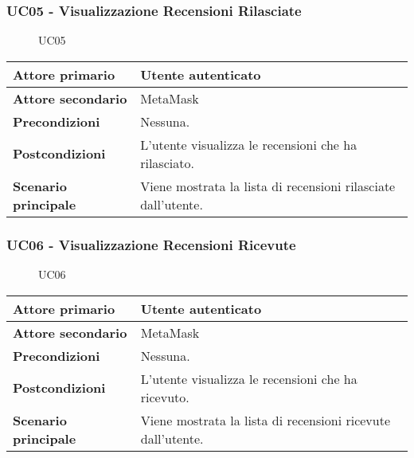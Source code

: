 \subsubsection{UC05 - Visualizzazione Recensioni Rilasciate}
\label{UC05}

\begin{figure}[H]
    \centering
    
    \caption{UC05}
 \end{figure}

\begin{center}
\renewcommand{\arraystretch}{1.5}
\begin{tabular}{ | m{10em} | m{20em} | }
    \hline
    \textbf{Attore primario} & Utente autenticato \\
    \hline
    \textbf{Attore secondario} & MetaMask \\
    \hline
    \textbf{Precondizioni} & Nessuna. \\
    \hline
    \textbf{Postcondizioni} & L'utente visualizza le recensioni che ha rilasciato. \\
    \hline
    \textbf{Scenario principale} & Viene mostrata la lista di recensioni rilasciate dall'utente. \\
    \hline
   \end{tabular}
\end{center}

\subsubsection{UC06 - Visualizzazione Recensioni Ricevute}
\label{UC06}

\begin{figure}[H]
    \centering
    
    \caption{UC06}
 \end{figure}

\begin{center}
\renewcommand{\arraystretch}{1.5}
\begin{tabular}{ | m{10em} | m{20em} | }
    \hline
    \textbf{Attore primario} & Utente autenticato \\
    \hline
    \textbf{Attore secondario} & MetaMask \\
    \hline
    \textbf{Precondizioni} & Nessuna. \\
    \hline
    \textbf{Postcondizioni} & L'utente visualizza le recensioni che ha ricevuto. \\
    \hline
    \textbf{Scenario principale} & Viene mostrata la lista di recensioni ricevute dall'utente. \\
    \hline
   \end{tabular}
\end{center}

